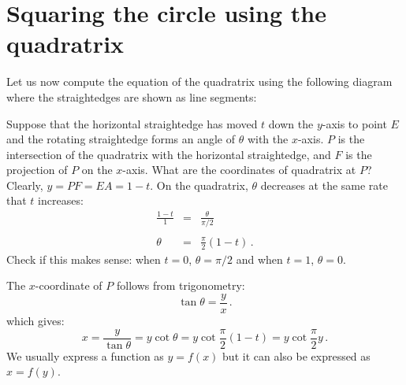 \section{Squaring the circle using the quadratrix}\label{s.square}

Let us now compute the equation of the quadratrix using the following diagram where the straightedges are shown as line segments:

\begin{center}
\end{center}

Suppose that the horizontal straightedge has moved $t$ down the $y$-axis to point $E$ and the rotating straightedge forms an angle of $\theta$ with the $x$-axis. $P$ is the intersection of the quadratrix with the horizontal straightedge, and $F$ is the projection of $P$ on the $x$-axis. What are the coordinates of quadratrix at $P$? Clearly, $y=PF=EA=1-t$. On the quadratrix, $\theta$ decreases at the same rate that $t$ increases:
\begin{eqnarray*}
\frac{1-t}{1} &=& \frac{\theta}{\pi/2}\\
&&\\
\theta &=&\frac{\pi}{2}(1-t)\,.
\end{eqnarray*}
Check if this makes sense: when $t=0$, $\theta=\pi/2$ and when $t=1$, $\theta=0$.

The $x$-coordinate of $P$ follows from trigonometry:
\[
\tan \theta = \frac{y}{x}\,.
\]
which gives:
\[
x = \frac{y}{\tan\theta}=y\cot\theta=y\cot \frac{\pi}{2}(1-t)=y\cot \frac{\pi}{2}y\,.
\]
We usually express a function as $y=f(x)$ but it can also be expressed as $x=f(y)$.

